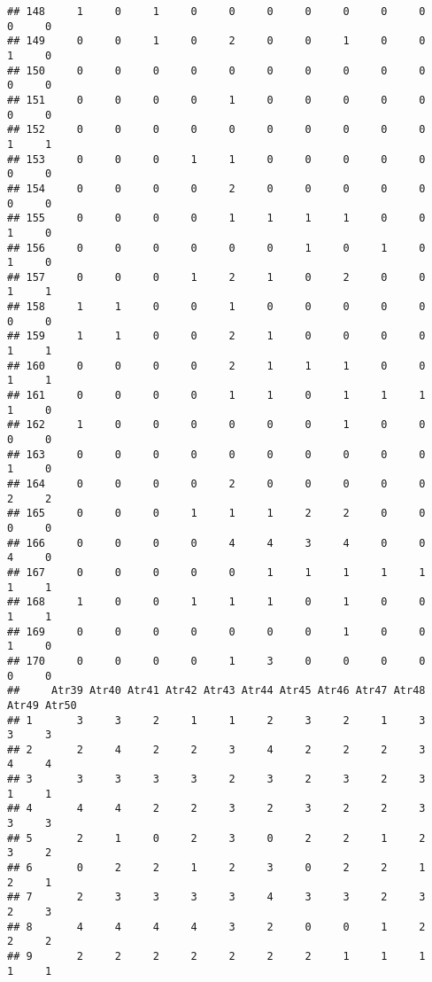 \documentclass[
]{article}
\begin{document}
\begin{verbatim}
## 148     1     0     1     0     0     0     0     0     0     0     0     0
## 149     0     0     1     0     2     0     0     1     0     0     1     0
## 150     0     0     0     0     0     0     0     0     0     0     0     0
## 151     0     0     0     0     1     0     0     0     0     0     0     0
## 152     0     0     0     0     0     0     0     0     0     0     1     1
## 153     0     0     0     1     1     0     0     0     0     0     0     0
## 154     0     0     0     0     2     0     0     0     0     0     0     0
## 155     0     0     0     0     1     1     1     1     0     0     1     0
## 156     0     0     0     0     0     0     1     0     1     0     1     0
## 157     0     0     0     1     2     1     0     2     0     0     1     1
## 158     1     1     0     0     1     0     0     0     0     0     0     0
## 159     1     1     0     0     2     1     0     0     0     0     1     1
## 160     0     0     0     0     2     1     1     1     0     0     1     1
## 161     0     0     0     0     1     1     0     1     1     1     1     0
## 162     1     0     0     0     0     0     0     1     0     0     0     0
## 163     0     0     0     0     0     0     0     0     0     0     1     0
## 164     0     0     0     0     2     0     0     0     0     0     2     2
## 165     0     0     0     1     1     1     2     2     0     0     0     0
## 166     0     0     0     0     4     4     3     4     0     0     4     0
## 167     0     0     0     0     0     1     1     1     1     1     1     1
## 168     1     0     0     1     1     1     0     1     0     0     1     1
## 169     0     0     0     0     0     0     0     1     0     0     1     0
## 170     0     0     0     0     1     3     0     0     0     0     0     0
##     Atr39 Atr40 Atr41 Atr42 Atr43 Atr44 Atr45 Atr46 Atr47 Atr48 Atr49 Atr50
## 1       3     3     2     1     1     2     3     2     1     3     3     3
## 2       2     4     2     2     3     4     2     2     2     3     4     4
## 3       3     3     3     3     2     3     2     3     2     3     1     1
## 4       4     4     2     2     3     2     3     2     2     3     3     3
## 5       2     1     0     2     3     0     2     2     1     2     3     2
## 6       0     2     2     1     2     3     0     2     2     1     2     1
## 7       2     3     3     3     3     4     3     3     2     3     2     3
## 8       4     4     4     4     3     2     0     0     1     2     2     2
## 9       2     2     2     2     2     2     2     1     1     1     1     1

\end{verbatim}
\end{document}
